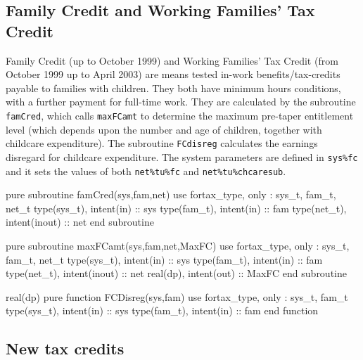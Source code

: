 \documentclass[11pt,thmsa,letter,ukenglish]{article}
\begin{document}
\subsection{Family Credit and Working Families' Tax Credit}
Family Credit (up to October 1999) and Working Families' Tax Credit (from October 1999 up to April 2003) are means tested in-work benefits/tax-credits payable to families with children. They both have minimum hours conditions, with a further payment for full-time work. They are calculated by the subroutine \texttt{famCred}, which calls \texttt{maxFCamt} to determine the maximum pre-taper entitlement level (which depends upon the number and age of children, together with childcare expenditure). The subroutine \texttt{FCdisreg} calculates the earnings disregard for childcare expenditure. The system parameters are defined in \texttt{sys\%fc} and it sets the values of both \texttt{net\%tu\%fc} and \texttt{net\%tu\%chcaresub}.

\begin{fortrancode}
pure subroutine famCred(sys,fam,net)
    use fortax_type, only : sys_t, fam_t, net_t
    type(sys_t), intent(in)    :: sys
    type(fam_t), intent(in)    :: fam
    type(net_t), intent(inout) :: net
end subroutine
\end{fortrancode}

\begin{fortrancode}
pure subroutine maxFCamt(sys,fam,net,MaxFC)
    use fortax_type, only : sys_t, fam_t, net_t
    type(sys_t), intent(in)    :: sys
    type(fam_t), intent(in)    :: fam
    type(net_t), intent(inout) :: net
    real(dp), intent(out)      :: MaxFC
end subroutine
\end{fortrancode}

\begin{fortrancode}
real(dp) pure function FCDisreg(sys,fam)
    use fortax_type, only : sys_t, fam_t
    type(sys_t), intent(in) :: sys
    type(fam_t), intent(in) :: fam
end function
\end{fortrancode}


\subsection{New tax credits}
\end{document}
